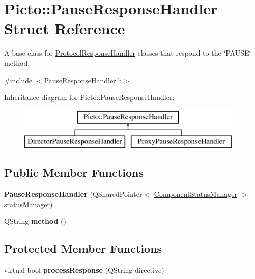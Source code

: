 \hypertarget{struct_picto_1_1_pause_response_handler}{\section{Picto\-:\-:Pause\-Response\-Handler Struct Reference}
\label{struct_picto_1_1_pause_response_handler}
}


A base class for \hyperlink{struct_picto_1_1_protocol_response_handler}{Protocol\-Response\-Handler} classes that respond to the \char`\"{}\-P\-A\-U\-S\-E\char`\"{} method.  




{\ttfamily \#include $<$Pause\-Response\-Handler.\-h$>$}

Inheritance diagram for Picto\-:\-:Pause\-Response\-Handler\-:\begin{figure}[H]
\begin{center}
\leavevmode
\includegraphics[height=2.000000cm]{struct_picto_1_1_pause_response_handler}
\end{center}
\end{figure}
\subsection*{Public Member Functions}
\begin{DoxyCompactItemize}
\item 
\hypertarget{struct_picto_1_1_pause_response_handler_ac4339d5b298cf43cf287ffc05385a53c}{{\bfseries Pause\-Response\-Handler} (Q\-Shared\-Pointer$<$ \hyperlink{class_component_status_manager}{Component\-Status\-Manager} $>$ status\-Manager)}\label{struct_picto_1_1_pause_response_handler_ac4339d5b298cf43cf287ffc05385a53c}

\item 
\hypertarget{struct_picto_1_1_pause_response_handler_a7daf54e7fb0aeabc50d5c96a237a04a2}{Q\-String {\bfseries method} ()}\label{struct_picto_1_1_pause_response_handler_a7daf54e7fb0aeabc50d5c96a237a04a2}

\end{DoxyCompactItemize}
\subsection*{Protected Member Functions}
\begin{DoxyCompactItemize}
\item 
\hypertarget{struct_picto_1_1_pause_response_handler_a10f234ef1c2b051a0dd16930de0e1aca}{virtual bool {\bfseries process\-Response} (Q\-String directive)}\label{struct_picto_1_1_pause_response_handler_a10f234ef1c2b051a0dd16930de0e1aca}

\end{DoxyCompactItemize}


